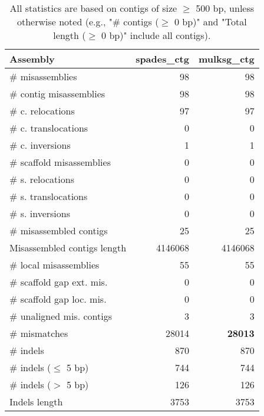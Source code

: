 \documentclass[12pt,a4paper]{article}
\begin{document}
\begin{table}[ht]
\begin{center}
\caption{All statistics are based on contigs of size $\geq$ 500 bp, unless otherwise noted (e.g., "\# contigs ($\geq$ 0 bp)" and "Total length ($\geq$ 0 bp)" include all contigs).}
\begin{tabular}{|l*{2}{|r}|}
\hline
Assembly & spades\_ctg & mulksg\_ctg \\ \hline
\# misassemblies & 98 & 98 \\ \hline
\hspace{2mm}\# contig misassemblies & 98 & 98 \\ \hline
\hspace{5mm}\# c. relocations & 97 & 97 \\ \hline
\hspace{5mm}\# c. translocations & 0 & 0 \\ \hline
\hspace{5mm}\# c. inversions & 1 & 1 \\ \hline
\hspace{2mm}\# scaffold misassemblies & 0 & 0 \\ \hline
\hspace{5mm}\# s. relocations & 0 & 0 \\ \hline
\hspace{5mm}\# s. translocations & 0 & 0 \\ \hline
\hspace{5mm}\# s. inversions & 0 & 0 \\ \hline
\# misassembled contigs & 25 & 25 \\ \hline
Misassembled contigs length & 4146068 & 4146068 \\ \hline
\# local misassemblies & 55 & 55 \\ \hline
\# scaffold gap ext. mis. & 0 & 0 \\ \hline
\# scaffold gap loc. mis. & 0 & 0 \\ \hline
\# unaligned mis. contigs & 3 & 3 \\ \hline
\# mismatches & 28014 & {\bf 28013} \\ \hline
\# indels & 870 & 870 \\ \hline
\hspace{5mm}\# indels ($\leq$ 5 bp) & 744 & 744 \\ \hline
\hspace{5mm}\# indels ($>$ 5 bp) & 126 & 126 \\ \hline
Indels length & 3753 & 3753 \\ \hline
\end{tabular}
\end{center}
\end{table}
\end{document}

